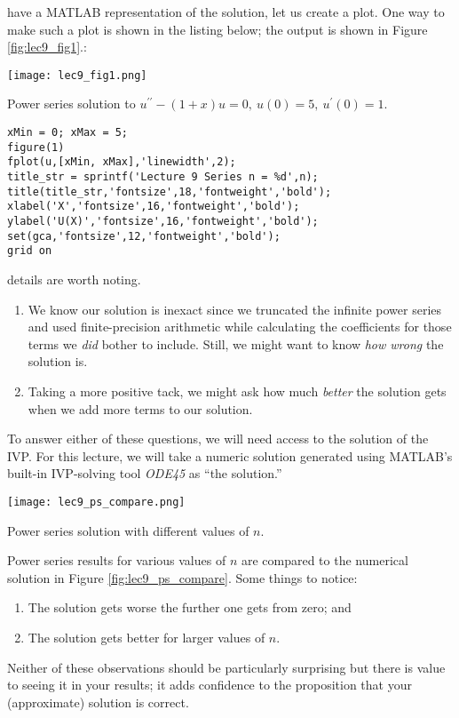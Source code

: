  have a MATLAB representation of the solution, let us create a plot.  One way to make such a plot is shown in the listing below; the output is shown in Figure \ref{fig:lec9_fig1}.:
\begin{marginfigure}
\texttt{[image: lec9\_fig1.png]}
\caption{Power series solution to $u^{\prime \prime}-(1+x)u=0, \ u(0)=5,\ u^{\prime}(0)=1$.}
\label{fig:lec9_fig1}
\end{marginfigure}
\begin{lstlisting}[name=lec9_ex1]
xMin = 0; xMax = 5;
figure(1)
fplot(u,[xMin, xMax],'linewidth',2);
title_str = sprintf('Lecture 9 Series n = %d',n);
title(title_str,'fontsize',18,'fontweight','bold');
xlabel('X','fontsize',16,'fontweight','bold');
ylabel('U(X)','fontsize',16,'fontweight','bold');
set(gca,'fontsize',12,'fontweight','bold');
grid on
\end{lstlisting}
 details are worth noting.  
\begin{enumerate}
\item We know our solution is inexact since we truncated the infinite power series and used finite-precision arithmetic while calculating the coefficients for those terms we \emph{did} bother to include.  Still, we might want to know \emph{how wrong} the solution is.
\item Taking a more positive tack, we might ask how much \emph{better} the solution gets when we add more terms to our solution.
\end{enumerate}
To answer either of these questions, we will need access to the solution of the IVP.  For this lecture, we will take a numeric solution generated using MATLAB's built-in IVP-solving tool \emph{ODE45} as ``the solution.''
\begin{marginfigure}
\texttt{[image: lec9\_ps\_compare.png]}
\caption{Power series solution with different values of $n$.}
\label{fig:lec9_ps_compare}
\end{marginfigure}

Power series results for various values of $n$ are compared to the numerical solution in Figure \ref{fig:lec9_ps_compare}.  Some things to notice:
\begin{enumerate}
\item The solution gets worse the further one gets from zero; and
\item The solution gets better for larger values of $n$.  
\end{enumerate}
Neither of these observations should be particularly surprising but there is value to seeing it in your results; it adds confidence to the proposition that your (approximate) solution is correct.

